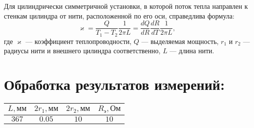 \documentclass[20pt]{article}
\begin{document}
Для цилиндрически симметричной установки, в которой поток
тепла направлен к стенкам цилиндра от нити, расположенной по его
оси, справедлива формула:
\[
	\varkappa = \frac{Q}{T_1-T_2} \frac{1}{2\pi L} =  \frac{dQ}{dR} \frac{dR}{dT} \frac{1}{2\pi L},
\]
где $\varkappa$ --- коэффициент теплопроводности, $Q$ --- выделяемая мощность, $r_1$ и $r_2$ --- радиусы нити и внешнего цилиндра соответственно, $L$ --- длина нити.
\section{Обработка результатов измерений:}

\begin{tabular}{|c|c|c|c|}

\hline $L, \text{мм}$ & $2r_1, \text{мм}$ & $2r_2, \text{мм}$ & $R_{\text{э}}, \text{Ом}$ 
\\\hline $367$ & $0.05$ & $10$ & $10$ \\\hline
\end{tabular}
\end{document}
